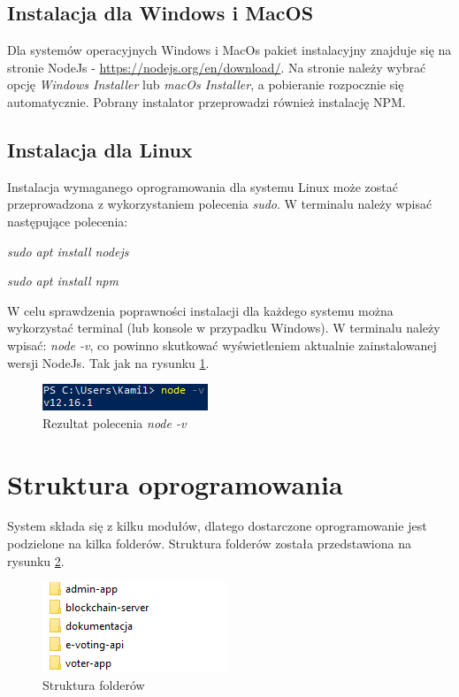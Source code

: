 \documentclass[a4paper,12pt]{book}
\begin{document}
\subsection{Instalacja dla Windows i MacOS}
Dla systemów operacyjnych Windows i MacOs pakiet instalacyjny znajduje się na stronie NodeJs - \url{https://nodejs.org/en/download/}. Na stronie należy wybrać opcję \textit{Windows Installer} lub \textit{macOs Installer}, a pobieranie rozpocznie się automatycznie. Pobrany instalator przeprowadzi również instalację NPM.

\subsection{Instalacja dla Linux}
Instalacja wymaganego oprogramowania dla systemu Linux może zostać przeprowadzona z wykorzystaniem polecenia \textit{sudo}. W terminalu należy wpisać następujące polecenia: 

\textit{sudo apt install nodejs}

\textit{sudo apt install npm}

W celu sprawdzenia poprawności instalacji dla każdego systemu można wykorzystać terminal (lub konsole w przypadku Windows). W terminalu należy wpisać: \textit{node -v}, co powinno skutkować wyświetleniem aktualnie zainstalowanej wersji NodeJs. Tak jak na rysunku \ref{nodeversion}.

\begin{figure}[h]
	\centering
	\includegraphics{images/node_version.png}
	\caption{Rezultat polecenia \textit{node -v}}\label{nodeversion}
\end {figure}

\section{Struktura oprogramowania}

System składa się z kilku modułów, dlatego dostarczone oprogramowanie jest podzielone na kilka folderów. Struktura folderów została przedstawiona na rysunku \ref{foldery}.

\begin{figure}[h]
	\centering
	\includegraphics{images/foldery.png}
	\caption{Struktura folderów}\label{foldery}
\end {figure}
\end{document}
